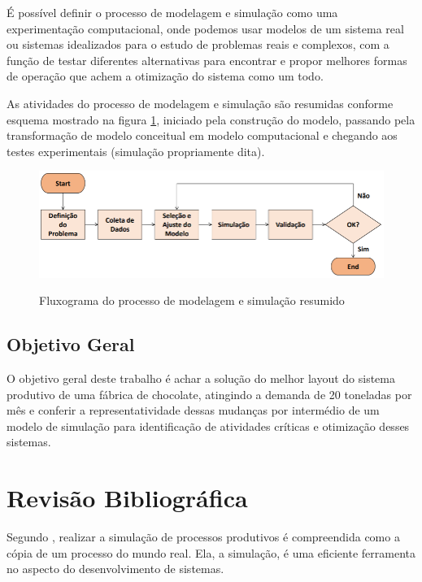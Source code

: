 \documentclass[
	12pt,				%
	openright,			%
	oneside,			%
	a4paper,			%
	english,			%
	french,				%
	spanish,			%
	brazil				%
	]{abntex2}
\begin{document}
É possível definir o processo de modelagem e simulação como uma experimentação computacional, onde podemos usar modelos de um sistema real ou sistemas idealizados para o estudo de problemas reais e complexos, com a função de testar diferentes alternativas para encontrar e propor melhores formas de operação que achem a otimização do sistema como um todo. 

As atividades do processo de modelagem e simulação são resumidas conforme esquema mostrado na figura \ref{figfluxo}, iniciado pela construção do modelo, passando pela transformação de modelo conceitual em modelo computacional e chegando aos testes experimentais (simulação propriamente dita).

\begin{figure}[H]
\begin{center}
\caption{Fluxograma do processo de modelagem e simulação resumido}
\includegraphics[scale=0.5]{../../Pictures/simulacaoresumida.png} 
\label{figfluxo}
\end{center}
\end{figure}

\section{Objetivo Geral}

O objetivo geral deste trabalho é achar a solução do melhor layout do sistema produtivo de uma fábrica de chocolate, atingindo a demanda de 20 toneladas por mês e conferir a representatividade dessas mudanças por intermédio de um modelo de simulação para identificação de atividades críticas e otimização desses sistemas.


\chapter{Revisão Bibliográfica}

Segundo \cite{Miyagi}, realizar a simulação de processos produtivos é compreendida como a cópia de um processo do mundo real. Ela, a simulação, é uma eficiente ferramenta no aspecto do desenvolvimento de sistemas. 
\end{document}
